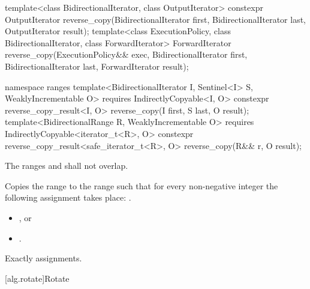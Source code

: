 %
\begin{itemdecl}
template<class BidirectionalIterator, class OutputIterator>
  constexpr OutputIterator
    reverse_copy(BidirectionalIterator first, BidirectionalIterator last,
                 OutputIterator result);
template<class ExecutionPolicy, class BidirectionalIterator, class ForwardIterator>
  ForwardIterator
    reverse_copy(ExecutionPolicy&& exec,
                 BidirectionalIterator first, BidirectionalIterator last,
                 ForwardIterator result);
\end{itemdecl}
\begin{addedblock}
\begin{itemdecl}
namespace ranges {
  template<BidirectionalIterator I, Sentinel<I> S, WeaklyIncrementable O>
    requires IndirectlyCopyable<I, O>
    constexpr reverse_copy_result<I, O>
      reverse_copy(I first, S last, O result);
  template<BidirectionalRange R, WeaklyIncrementable O>
    requires IndirectlyCopyable<iterator_t<R>, O>
    constexpr reverse_copy_result<safe_iterator_t<R>, O>
      reverse_copy(R&& r, O result);
}
\end{itemdecl}
\end{addedblock}

\begin{itemdescr}
\pnum
\requires
The ranges
and
shall not overlap.

\pnum
\effects
Copies the range
to the range
such that
for every non-negative integer
the following assignment takes place:
.

\pnum
\returns
\begin{itemize}
\item {}, or

\item {}.
\end{itemize}

\pnum
\complexity
Exactly
assignments.
\end{itemdescr}


[alg.rotate]{Rotate}



